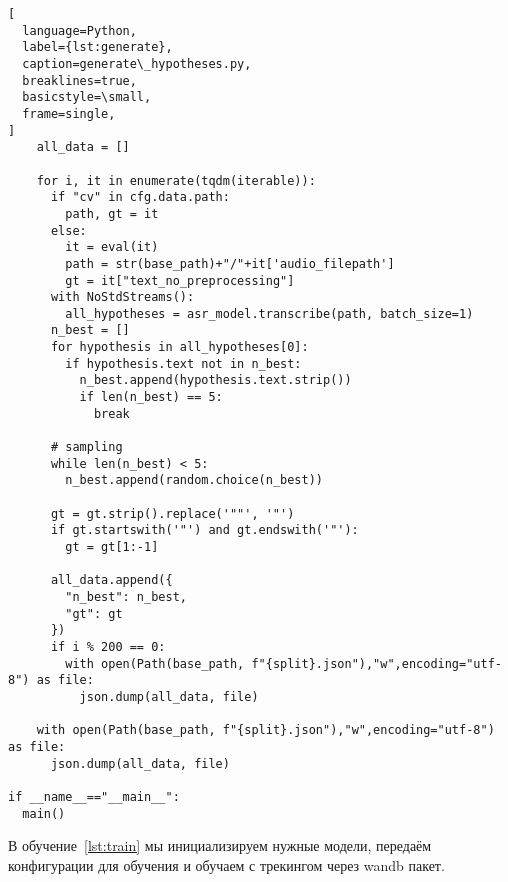 \begin{lstlisting}[
  language=Python,
  label={lst:generate},
  caption=generate\_hypotheses.py,
  breaklines=true,
  basicstyle=\small,
  frame=single,
]
    all_data = []

    for i, it in enumerate(tqdm(iterable)):
      if "cv" in cfg.data.path:
        path, gt = it
      else:
        it = eval(it)
        path = str(base_path)+"/"+it['audio_filepath']
        gt = it["text_no_preprocessing"]
      with NoStdStreams():
        all_hypotheses = asr_model.transcribe(path, batch_size=1)
      n_best = []
      for hypothesis in all_hypotheses[0]:
        if hypothesis.text not in n_best:
          n_best.append(hypothesis.text.strip())
          if len(n_best) == 5:
            break

      # sampling
      while len(n_best) < 5:
        n_best.append(random.choice(n_best))

      gt = gt.strip().replace('""', '"')
      if gt.startswith('"') and gt.endswith('"'):
        gt = gt[1:-1]

      all_data.append({
        "n_best": n_best,
        "gt": gt
      })
      if i % 200 == 0:
        with open(Path(base_path, f"{split}.json"),"w",encoding="utf-8") as file:
          json.dump(all_data, file)

    with open(Path(base_path, f"{split}.json"),"w",encoding="utf-8") as file:
      json.dump(all_data, file)

if __name__=="__main__":
  main()
\end{lstlisting}

В обучение~\ref{lst:train} мы инициализируем нужные модели, передаём конфигурации для обучения и обучаем с трекингом через wandb пакет.

